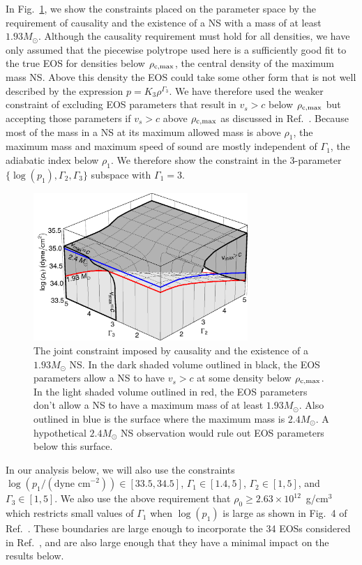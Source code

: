 \documentclass[twocolumn,prd,amssymb,aps,nofootinbib,showpacs,epsf]{revtex4}
\begin{document}
In Fig.~\ref{fig:mvs3d}, we show the constraints placed on the parameter space by the requirement of causality and the existence of a NS with a mass of at least $1.93M_\odot$. Although the causality requirement must hold for all densities, we have only assumed that the piecewise polytrope used here is a sufficiently good fit to the true EOS for densities below $\rho_{\rm c, max}$, the central density of the maximum mass NS. Above this density the EOS could take some other form that is not well described by the expression $p = K_3 \rho^{\Gamma_3}$. We have therefore used the weaker constraint of excluding EOS parameters that result in $v_s > c$ below $\rho_{\rm c, max}$ but accepting those parameters if $v_s > c$ above $\rho_{\rm c, max}$ as discussed in Ref.~\cite{ReadLackey2009}. Because most of the mass in a NS at its maximum allowed mass is above $\rho_1$, the maximum mass and maximum speed of sound are mostly independent of $\Gamma_1$, the adiabatic index below $\rho_1$. We therefore show the constraint in the 3-parameter $\{\log(p_1), \Gamma_2, \Gamma_3\}$ subspace with $\Gamma_1=3$. 

\begin{figure}[!htb]
\begin{center}
\includegraphics[width=3.2in]{mvs3d.png}
\caption{The joint constraint imposed by causality and the existence of a $1.93M_\odot$ NS. In the dark shaded volume outlined in black, the EOS parameters allow a NS to have $v_s>c$ at some density below $\rho_{\rm c, max}$. In the light shaded volume outlined in red, the EOS parameters don't allow a NS to have a maximum mass of at least $1.93M_\odot$. Also outlined in blue is the surface where the maximum mass is $2.4M_\odot$. A hypothetical $2.4M_\odot$ NS observation would rule out EOS parameters below this surface.}
\label{fig:mvs3d}
\end{center}
\end{figure}

In our analysis below, we will also use the constraints $\log(p_1/(\text{dyne cm}^{-2})) \in [33.5, 34.5]$, $\Gamma_1 \in [1.4, 5]$, $\Gamma_2 \in [1, 5]$, and $\Gamma_3 \in [1, 5]$. We also use the above requirement that $\rho_0 \ge 2.63\times 10^{12}$~g/cm$^3$ which restricts small values of $\Gamma_1$ when $\log(p_1)$ is large as shown in Fig.~4 of Ref.~\cite{ReadLackey2009}. These boundaries are large enough to incorporate the 34 EOSs considered in Ref.~\cite{ReadLackey2009}, and are also large enough that they have a minimal impact on the results below.
\end{document}
